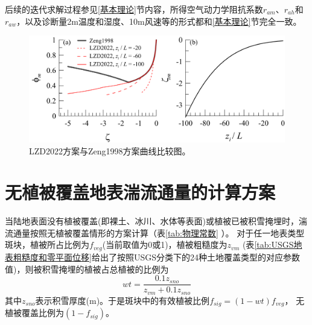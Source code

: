 后续的迭代求解过程参见\ref{基本理论}节内容，所得空气动力学阻抗系数$r_{am}$、$r_{ah}$和$r_{aw}$，以及诊断量2m温度和湿度、10m风速等的形式都和\ref{基本理论}节完全一致。
{
\begin{figure}[]
\centering
\includegraphics[scale=0.7]{Figures/地表湍流交换过程/LZD2022方案与Zeng1998方案曲线比较图.png}
\caption{LZD2022方案与Zeng1998方案曲线比较图。}
\label{fig:LZD2022方案与Zeng1998方案曲线比较图}
\end{figure}
}


\section{无植被覆盖地表湍流通量的计算方案}\label{无植被覆盖地表湍流通量的计算方案}
当陆地表面没有植被覆盖(即裸土、冰川、水体等表面)或植被已被积雪掩埋时，湍流通量按照无植被覆盖情形的方案计算（表\ref{tab:物理常数} ）。
对于任一地表类型斑块，植被所占比例为$f_{veg}$(当前取值为0或1)，植被粗糙度为$z_{vm}$
(表\ref{tab:USGS地表粗糙度和零平面位移}给出了按照USGS分类下的24种土地覆盖类型的对应参数值)，则被积雪掩埋的植被占总植被的比例为
\begin{equation}
wt=\frac{0.1 z_{{sno}}}{z_{v m}+0.1 z_{{sno}}}
\end{equation}
其中$z_{sno}$表示积雪厚度(m)。于是斑块中的有效植被比例$f_{sig}=\left(1-wt\right)f_{veg}$，
无植被覆盖比例为$\left(1-f_{sig}\right)$。

